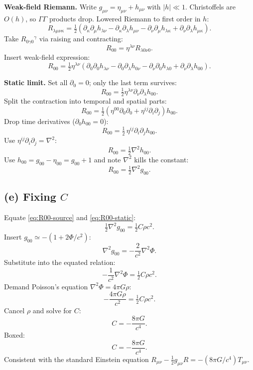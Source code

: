 \documentclass[11pt]{article}
\newcommand{\Lap}{\nabla^{2}}
\begin{document}
\textbf{Weak-field Riemann.} Write $g_{\mu\nu}=\eta_{\mu\nu}+h_{\mu\nu}$ with $|h|\ll 1$. Christoffels are $O(h)$, so $\Gamma\Gamma$ products drop. Lowered Riemann to first order in $h$:
\[ R_{\lambda\mu\nu\kappa}=\tfrac12\!\left(\partial_\kappa\partial_\mu h_{\lambda\nu}-\partial_\kappa\partial_\lambda h_{\mu\nu}-\partial_\nu\partial_\mu h_{\lambda\kappa}+\partial_\nu\partial_\lambda h_{\mu\kappa}\right). \]
Take $R_{0\gamma 0}{}^\gamma$ via raising and contracting:
\[ R_{00}=\eta^{\lambda\nu}R_{\lambda 0\nu 0}. \]
Insert weak-field expression:
\[ R_{00}=\tfrac12\eta^{\lambda\nu}\!\left(\partial_0\partial_0 h_{\lambda\nu}-\partial_0\partial_\lambda h_{0\nu}-\partial_\nu\partial_0 h_{\lambda 0}+\partial_\nu\partial_\lambda h_{00}\right). \]

\textbf{Static limit.} Set all $\partial_0=0$; only the last term survives:
\[ R_{00}=\tfrac12\eta^{\lambda\nu}\partial_\nu\partial_\lambda h_{00}. \]
Split the contraction into temporal and spatial parts:
\[ R_{00}=\tfrac12\!\left(\eta^{00}\partial_0\partial_0+\eta^{ij}\partial_i\partial_j\right)\!h_{00}. \]
Drop time derivatives ($\partial_0 h_{00}=0$):
\[ R_{00}=\tfrac12\,\eta^{ij}\partial_i\partial_j h_{00}. \]
Use $\eta^{ij}\partial_i\partial_j=\Lap$:
\[ R_{00}=\tfrac12\Lap h_{00}. \]
Use $h_{00}=g_{00}-\eta_{00}=g_{00}+1$ and note $\Lap$ kills the constant:
\begin{equation}
\boxed{\;R_{00}=\tfrac12\Lap g_{00}.\;}
\label{eq:R00-static}
\end{equation}

\subsection*{(e) Fixing $C$}

Equate \eqref{eq:R00-source} and \eqref{eq:R00-static}:
\[ \tfrac12\Lap g_{00}=\tfrac12 C\rho c^2. \]
Insert $g_{00}\simeq-(1+2\Phi/c^2)$:
\[ \Lap g_{00}=-\frac{2}{c^2}\Lap\Phi. \]
Substitute into the equated relation:
\[ -\frac{1}{c^2}\Lap\Phi=\tfrac12 C\rho c^2. \]
Demand Poisson's equation $\Lap\Phi=4\pi G\rho$:
\[ -\frac{4\pi G\rho}{c^2}=\tfrac12 C\rho c^2. \]
Cancel $\rho$ and solve for $C$:
\[ C=-\frac{8\pi G}{c^4}. \]
Boxed:
\begin{equation}
\boxed{\;C=-\frac{8\pi G}{c^4}.\;}
\label{eq:C-value}
\end{equation}
Consistent with the standard Einstein equation $R_{\mu\nu}-\tfrac12 g_{\mu\nu}R=-(8\pi G/c^4)T_{\mu\nu}$.

\end{document}
